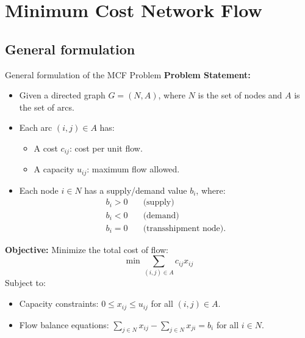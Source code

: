 \documentclass{beamer}
\begin{document}
\section{Minimum Cost Network Flow}

\subsection{{General formulation}}

\begin{frame}[allowframebreaks]{General formulation of the MCF Problem}
    \textbf{Problem Statement:}
    \begin{itemize}
        \item Given a directed graph \( G = (N, A) \), where \( N \) is the set of nodes and \( A \) is the set of arcs.
        \item Each arc \( (i, j) \in A \) has:
        \begin{itemize}
            \item A cost \( c_{ij} \): cost per unit flow.
            \item A capacity \( u_{ij} \): maximum flow allowed.
        \end{itemize}
        \item Each node \( i \in N \) has a supply/demand value \( b_i \), where:
        \begin{align*}
            b_i > 0 & \quad \text{(supply)} \\
            b_i < 0 & \quad \text{(demand)} \\
            b_i = 0 & \quad \text{(transshipment node).}
        \end{align*}
    \end{itemize}

    \textbf{Objective:} Minimize the total cost of flow:
    \[
    \min \sum_{(i,j) \in A} c_{ij} x_{ij}
    \]
    Subject to:
    \begin{itemize}
        \item Capacity constraints: \( 0 \leq x_{ij} \leq u_{ij} \) for all \( (i, j) \in A \).
        \item Flow balance equations: \( \sum_{j \in N} x_{ij} - \sum_{j \in N} x_{ji} = b_i \) for all \( i \in N \).
    \end{itemize}
\end{frame}
\end{document}
